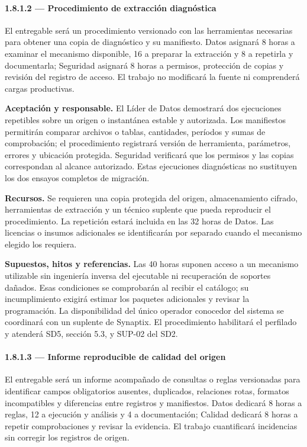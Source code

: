 \paragraph*{1.8.1.2 --- Procedimiento de extracción diagnóstica}
El entregable será un procedimiento versionado con las herramientas necesarias para obtener una copia de diagnóstico y su manifiesto. Datos asignará 8 horas a examinar el mecanismo disponible, 16 a preparar la extracción y 8 a repetirla y documentarla; Seguridad asignará 8 horas a permisos, protección de copias y revisión del registro de acceso. El trabajo no modificará la fuente ni comprenderá cargas productivas.

\textbf{Aceptación y responsable.} El Líder de Datos demostrará dos ejecuciones repetibles sobre un origen o instantánea estable y autorizada. Los manifiestos permitirán comparar archivos o tablas, cantidades, períodos y sumas de comprobación; el procedimiento registrará versión de herramienta, parámetros, errores y ubicación protegida. Seguridad verificará que los permisos y las copias correspondan al alcance autorizado. Estas ejecuciones diagnósticas no sustituyen los dos ensayos completos de migración.

\textbf{Recursos.} Se requieren una copia protegida del origen, almacenamiento cifrado, herramientas de extracción y un técnico suplente que pueda reproducir el procedimiento. La repetición estará incluida en las 32 horas de Datos. Las licencias o insumos adicionales se identificarán por separado cuando el mecanismo elegido los requiera.

\textbf{Supuestos, hitos y referencias.} Las 40 horas suponen acceso a un mecanismo utilizable sin ingeniería inversa del ejecutable ni recuperación de soportes dañados. Esas condiciones se comprobarán al recibir el catálogo; su incumplimiento exigirá estimar los paquetes adicionales y revisar la programación. La disponibilidad del único operador conocedor del sistema se coordinará con un suplente de Synaptix. El procedimiento habilitará el perfilado y atenderá SD5, sección 5.3, y SUP-02 del SD2.

\paragraph*{1.8.1.3 --- Informe reproducible de calidad del origen}
El entregable será un informe acompañado de consultas o reglas versionadas para identificar campos obligatorios ausentes, duplicados, relaciones rotas, formatos incompatibles y diferencias entre registros y manifiestos. Datos dedicará 8 horas a reglas, 12 a ejecución y análisis y 4 a documentación; Calidad dedicará 8 horas a repetir comprobaciones y revisar la evidencia. El trabajo cuantificará incidencias sin corregir los registros de origen.

